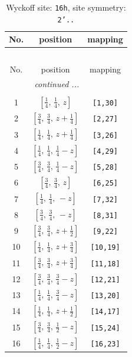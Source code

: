 \documentclass[fleqn,8pt]{jsarticle}
\begin{document}
\renewcommand{\arraystretch}{1.2}
\begin{longtable}{ccc}
\caption{Wyckoff site: {\tt 16h}, site symmetry: {\tt 2'..}}
 \\
 \hline \hline
No. & position & mapping \\ \hline \endfirsthead

\multicolumn{2}{l}{\tablename\ \thetable{}} \\
 \hline \hline
No. & position & mapping \\ \hline \endhead

 \hline \hline
\multicolumn{2}{r}{\footnotesize\it continued ...} \\ \endfoot

 \hline \hline
\multicolumn{2}{r}{} \\ \endlastfoot

1 & $\left[ \frac{1}{4},\, \frac{1}{4},\, z \right]$ & {\tt [1,30]} \\ \hline
2 & $\left[ \frac{3}{4},\, \frac{3}{4},\, z + \frac{1}{4} \right]$ & {\tt [2,27]} \\ \hline
3 & $\left[ \frac{1}{4},\, \frac{1}{4},\, z + \frac{1}{4} \right]$ & {\tt [3,26]} \\ \hline
4 & $\left[ \frac{1}{4},\, \frac{1}{4},\, \frac{1}{4} - z \right]$ & {\tt [4,29]} \\ \hline
5 & $\left[ \frac{3}{4},\, \frac{3}{4},\, \frac{1}{4} - z \right]$ & {\tt [5,28]} \\ \hline
6 & $\left[ \frac{3}{4},\, \frac{3}{4},\, z \right]$ & {\tt [6,25]} \\ \hline
7 & $\left[ \frac{1}{4},\, \frac{1}{4},\, - z \right]$ & {\tt [7,32]} \\ \hline
8 & $\left[ \frac{3}{4},\, \frac{3}{4},\, - z \right]$ & {\tt [8,31]} \\ \hline
9 & $\left[ \frac{3}{4},\, \frac{3}{4},\, z + \frac{1}{2} \right]$ & {\tt [9,22]} \\ \hline
10 & $\left[ \frac{1}{4},\, \frac{1}{4},\, z + \frac{3}{4} \right]$ & {\tt [10,19]} \\ \hline
11 & $\left[ \frac{3}{4},\, \frac{3}{4},\, z + \frac{3}{4} \right]$ & {\tt [11,18]} \\ \hline
12 & $\left[ \frac{3}{4},\, \frac{3}{4},\, \frac{3}{4} - z \right]$ & {\tt [12,21]} \\ \hline
13 & $\left[ \frac{1}{4},\, \frac{1}{4},\, \frac{3}{4} - z \right]$ & {\tt [13,20]} \\ \hline
14 & $\left[ \frac{1}{4},\, \frac{1}{4},\, z + \frac{1}{2} \right]$ & {\tt [14,17]} \\ \hline
15 & $\left[ \frac{3}{4},\, \frac{3}{4},\, \frac{1}{2} - z \right]$ & {\tt [15,24]} \\ \hline
16 & $\left[ \frac{1}{4},\, \frac{1}{4},\, \frac{1}{2} - z \right]$ & {\tt [16,23]} \\
\end{longtable}
\end{document}
